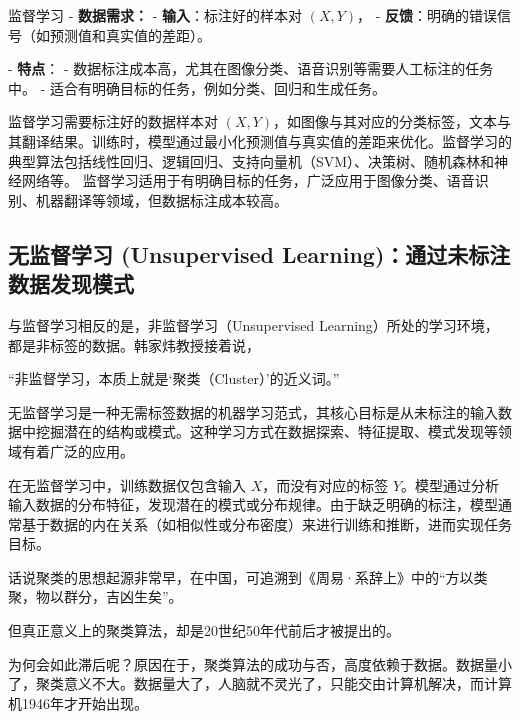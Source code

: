%

监督学习
- {\bf 数据需求：}
  - {\bf 输入}：标注好的样本对 $(X, Y)$，
  - {\bf 反馈}：明确的错误信号（如预测值和真实值的差距）。
  
- {\bf 特点}：
  - 数据标注成本高，尤其在图像分类、语音识别等需要人工标注的任务中。
  - 适合有明确目标的任务，例如分类、回归和生成任务。


监督学习需要标注好的数据样本对 $(X, Y)$，如图像与其对应的分类标签，文本与其翻译结果。训练时，模型通过最小化预测值与真实值的差距来优化。监督学习的典型算法包括线性回归、逻辑回归、支持向量机（SVM）、决策树、随机森林和神经网络等。
监督学习适用于有明确目标的任务，广泛应用于图像分类、语音识别、机器翻译等领域，但数据标注成本较高。
  
\subsection{ 无监督学习 (Unsupervised Learning)：通过未标注数据发现模式}

与监督学习相反的是，非监督学习（Unsupervised Learning）所处的学习环境，都是非标签的数据。韩家炜教授接着说\cite{han2011data}，

“非监督学习，本质上就是‘聚类（Cluster）’的近义词。”

无监督学习是一种无需标签数据的机器学习范式，其核心目标是从未标注的输入数据中挖掘潜在的结构或模式。这种学习方式在数据探索、特征提取、模式发现等领域有着广泛的应用。

在无监督学习中，训练数据仅包含输入 $X$，而没有对应的标签 $Y$。模型通过分析输入数据的分布特征，发现潜在的模式或分布规律。由于缺乏明确的标注，模型通常基于数据的内在关系（如相似性或分布密度）来进行训练和推断，进而实现任务目标。

话说聚类的思想起源非常早，在中国，可追溯到《周易·系辞上》中的“方以类聚，物以群分，吉凶生矣”。

但真正意义上的聚类算法，却是20世纪50年代前后才被提出的。

为何会如此滞后呢？原因在于，聚类算法的成功与否，高度依赖于数据。数据量小了，聚类意义不大。数据量大了，人脑就不灵光了，只能交由计算机解决，而计算机1946年才开始出现。

